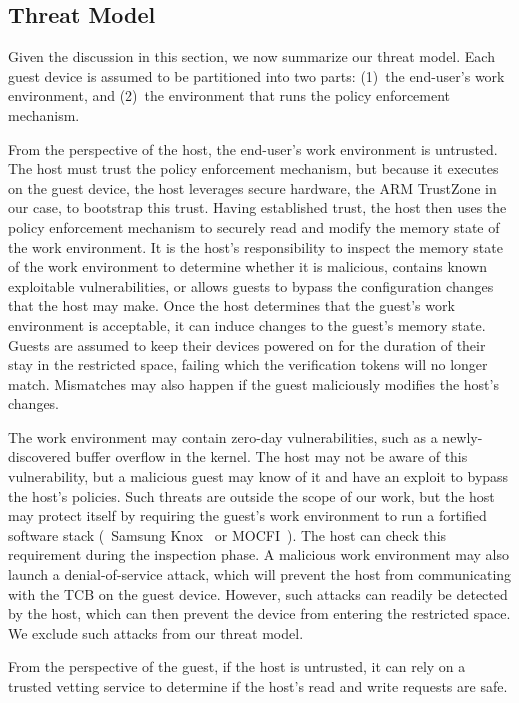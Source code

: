 \subsection{Threat Model} 
\label{section:threat}
%
Given the discussion in this section, we now summarize our threat model. 
Each guest device is assumed to be partitioned into two parts: (1)~the
end-user's work environment, and (2)~the environment that runs the policy
enforcement mechanism. 

From the perspective of the host, the end-user's work environment is untrusted.
The host must trust the policy enforcement mechanism, but because it executes
on the guest device, the host leverages secure hardware, the ARM TrustZone in
our case, to bootstrap this trust. Having established trust, the host then uses
the policy enforcement mechanism to securely read and modify the memory state
of the work environment. It is the host's responsibility to inspect the memory
state of the work environment to determine whether it is malicious, contains
known exploitable vulnerabilities, or allows guests to bypass the configuration
changes that the host may make.  Once the host determines that the guest's work
environment is acceptable, it can induce changes to the guest's memory state.
Guests are assumed to keep their devices powered on for the duration of their
stay in the restricted space, failing which the verification tokens will no
longer match. Mismatches may also happen if the guest maliciously modifies the
host's changes.

The work environment may contain zero-day vulnerabilities, such as a
newly-discovered buffer overflow in the kernel. The host may not be aware of
this vulnerability, but a malicious guest may know of it and have an exploit to
bypass the host's policies.  Such threats are outside the scope of our work,
but the host may protect itself by requiring the guest's work environment to
run a fortified software stack (\eg~Samsung Knox~\cite{knox:ccs14} or
MOCFI~\cite{mocfi:ndss12}). The host can check this requirement during the
inspection phase. A malicious work environment may also launch a
denial-of-service attack, which will prevent the host from communicating with
the TCB on the guest device.  However, such attacks can readily be detected by
the host, which can then prevent the device from entering the restricted space.
We exclude such attacks from our threat model.

From the perspective of the guest, if the host is untrusted, it can rely on a
trusted vetting service to determine if the host's read and write requests are
safe.






